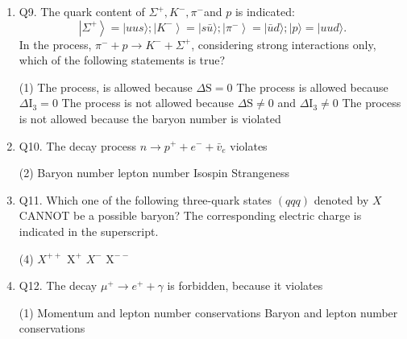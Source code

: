 \begin{enumerate}
	(ii) Electromagnetic\\
	(3) $\pi^0+\mathrm{n} \rightarrow \pi^{-}+\mathrm{p}$\hspace{2.6cm}
	(iii) Weak
	{}
	 \begin{tasks}(2)
		\task[\textbf{a.}]$(1$, iii), (2, ii), (3, i)
		\task[\textbf{b.}]$(1$, i), (2, ii), (3, iii)
		\task[\textbf{c.}](1, ii), (2, i), (3, iii)
		\task[\textbf{d.}](1, iii), (2, i), (3, ii) 
	\end{tasks}
	\item Q9. The quark content of $\Sigma^{+}, K^{-}, \pi^{-}$and $p$ is indicated:
	$$
	\left|\Sigma^{+}\right\rangle=|u u s\rangle ;\left|K^{-}\right\rangle=|s \bar{u}\rangle ;\left|\pi^{-}\right\rangle=|\bar{u} d\rangle ;|p\rangle=|u u d\rangle .
	$$
	In the process, $\pi^{-}+p \rightarrow K^{-}+\Sigma^{+}$, considering strong interactions only, which of the following statements is true?
	{}
	 \begin{tasks}(1)
		\task[\textbf{a.}]The process, is allowed because $\Delta \mathrm{S}=0$
		\task[\textbf{b.}] The process is allowed because $\Delta \mathrm{I}_3=0$
		\task[\textbf{c.}] The process is not allowed because $\Delta \mathrm{S} \neq 0$ and $\Delta \mathrm{I}_3 \neq 0$
		\task[\textbf{d.}]The process is not allowed because the baryon number is violated 
	\end{tasks}
	\item Q10. The decay process $n \rightarrow p^{+}+e^{-}+\bar{v}_e$ violates
	{}
	 \begin{tasks}(2)
		\task[\textbf{a.}]Baryon number
		\task[\textbf{b.}] lepton number
		\task[\textbf{c.}] Isospin
		\task[\textbf{d.}] Strangeness
	\end{tasks}
	\item Q11. Which one of the following three-quark states $(q q q)$ denoted by $X$ CANNOT be a possible baryon? The corresponding electric charge is indicated in the superscript.
	{}
	 \begin{tasks}(4)
		\task[\textbf{a.}]$X^{++}$
		\task[\textbf{b.}]$\mathrm{X}^{+}$
		\task[\textbf{c.}]$X^{-}$
		\task[\textbf{d.}] $\mathrm{X}^{--}$ 
	\end{tasks}
	\item Q12. The decay $\mu^{+} \rightarrow e^{+}+\gamma$ is forbidden, because it violates
	{}
	 \begin{tasks}(1)
		\task[\textbf{a.}] Momentum and lepton number conservations
		\task[\textbf{b.}]Baryon and lepton number conservations

\end{tasks}
\end{enumerate}
